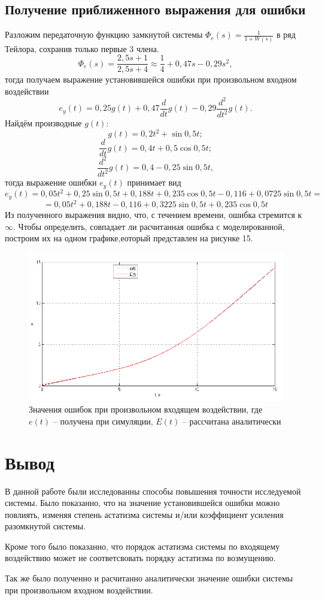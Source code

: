 \documentclass[a4paper, 11pt, russian]{article}
\begin{document}
    \subsection{Получение приближенного выражения для ошибки}
    Разложим передаточную функцию замкнутой системы $\Phi_e(s) = \displaystyle{\frac{1}{1 + W(s)}}$ в ряд Тейлора, сохранив только первые 3 члена. 
    $$\Phi_e(s) = \frac{2,5s + 1}{2,5s + 4} \approx \frac{1}{4} + 0,47s - 0,29s^2,$$
    тогда получаем выражение установившейся ошибки при произвольном входном воздействии
    $$e_y(t) = 0,25g(t) + 0,47\frac{d}{dt}g(t) - 0,29\frac{d^2}{dt^2}g(t).$$
    Найдём производные $g(t)$:
    $$g(t) = 0,2t^2 + \sin{0,5t};$$
    $$\frac{d}{dt}g(t) = 0,4t + 0,5\cos{0,5t};$$
    $$\frac{d^2}{dt^2}g(t) = 0,4 - 0,25\sin{0,5t},$$
    тогда выражение ошибки $e_y(t)$ принимает вид
    $$e_y(t) = 0,05t^2 + 0,25\sin{0,5t} + 0,188t + 0,235\cos{0,5t} - 0,116 + 0,0725\sin{0,5t} =$$
    $$= 0,05t^2 + 0,188t - 0,116 + 0,3225\sin{0,5t} + 0,235\cos{0,5t}$$
    Из полученного выражения видно, что, с течением времени, ошибка стремится к $\infty$. Чтобы определить, совпадает ли расчитанная ошибка с моделированной, построим их на одном графике,еоторый представлен на рисунке 15.
    \begin{figure}[ht!]
        \centering
        \includegraphics[scale = 0.75]{customInputTaylor.png}
        \caption{Значения ошибок при произвольном входящем воздействии, где $e(t)$ -- получена при симуляции, $E(t)$  -- рассчитана аналитически}
    \end{figure}
    \vspace{1.5cm}
    \section{Вывод}
    В данной работе были исследованны способы повышения точности исследуемой системы. Было показанно, что на значение установившейся ошибки можно повлиять, изменяя степень астатизма системы и/или коэффициент усиления разомкнутой системы.
    
    Кроме того было показанно, что порядок астатизма системы по входящему воздействию может не соответсвовать порядку астатизма по возмущению.
    
    Так же было полученно и расчитанно аналитически значение ошибки системы при произвольном входном воздействии.
\end{document}
